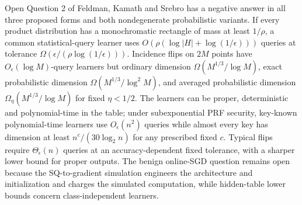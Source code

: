 Open Question 2 of Feldman, Kamath and Srebro has a negative answer in all three proposed forms and both nondegenerate probabilistic variants. If every product distribution has a monochromatic rectangle of mass at least $1/\rho$, a common statistical-query learner uses $O(\rho(\log|H|+\log(1/\epsilon)))$ queries at tolerance $\Omega(\epsilon/(\rho\log(1/\epsilon)))$. Incidence flips on $2M$ points have $O_\epsilon(\log M)$-query learners but ordinary dimension $\Omega(M^{1/3}/\log M)$, exact probabilistic dimension $\Omega(M^{1/3}/\log^2M)$, and averaged probabilistic dimension $\Omega_\eta(M^{1/3}/\log M)$ for fixed $\eta<1/2$. The learners can be proper, deterministic and polynomial-time in the table; under subexponential PRF security, key-known polynomial-time learners use $O_\epsilon(n^2)$ queries while almost every key has dimension at least $n^c/(30\log_2n)$ for any prescribed fixed $c$. Typical flips require $\Theta_\epsilon(n)$ queries at an accuracy-dependent fixed tolerance, with a sharper lower bound for proper outputs. The benign online-SGD question remains open because the SQ-to-gradient simulation engineers the architecture and initialization and charges the simulated computation, while hidden-table lower bounds concern class-independent learners.
